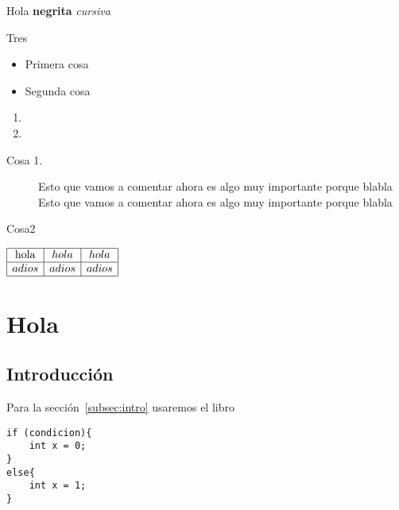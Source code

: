 
Hola \textbf{negrita} \emph{cursiva}


Tres

\begin{itemize}
\item
Primera cosa

\item
Segunda cosa
\end{itemize}

\begin{enumerate}
\item

\item
\end{enumerate}

\begin{description}
\item[Cosa 1.] Esto que vamos a comentar ahora es algo muy importante
porque blabla Esto que vamos a comentar ahora es algo muy importante
porque blabla

\item[Cosa2]
\end{description}

\begin{example}
\end{example}

$
\begin{array}{|c|c|c|}
\hline
\mathtt{\mathrm{hola}} & hola & hola\\
\hline
adios & adios & adios\\
\hline
\end{array}
$

\section{Hola}

\subsection{Introducción\label{subsec:intro}}

Para la sección~\ref{subsec:intro} usaremos el libro \cite{ejerciciosEDAT}

{\codesize
\lstset{language=Java}
\begin{lstlisting}[frame=single]
if (condicion){
	int x = 0;
}
else{
	int x = 1;
}
\end{lstlisting}
}